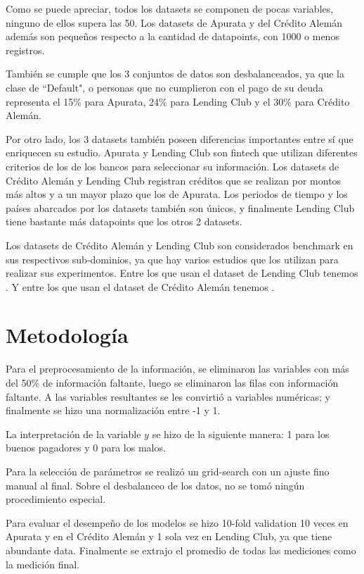 Como se puede apreciar, todos los datasets se componen de pocas variables, ninguno de ellos supera las 50. Los datasets de Apurata y del Crédito Alemán además son pequeños respecto a la cantidad de datapoints, con 1000 o menos registros.

También se cumple que los 3 conjuntos de datos son desbalanceados, ya que la clase de ``Default", o personas que no cumplieron con el pago de su deuda representa el 15\% para Apurata, 24\% para Lending Club y el 30\% para Crédito Alemán.

Por otro lado, los 3 datasets también poseen diferencias importantes entre sí que enriquecen su estudio. Apurata y Lending Club son fintech que utilizan diferentes criterios de los de los bancos para seleccionar su información. Los datasets de Crédito Alemán y Lending Club registran créditos que se realizan por montos más altos y a un mayor plazo que los de Apurata. Los periodos de tiempo y los países abarcados por los datasets también son únicos, y finalmente Lending Club tiene bastante más datapoints que los otros 2 datasets.

Los datasets de Crédito Alemán y Lending Club son considerados benchmark en sus respectivos sub-dominios, ya que hay varios estudios que los utilizan para realizar sus experimentos. Entre los que usan el dataset de Lending Club tenemos \cite{malekipirbazari2015risk, zhang2016research, zang2014credit, tan2018deep}. Y entre los que usan el dataset de Crédito Alemán tenemos \cite{harris2015credit, nanni2009experimental, brown2012experimental, wang2012two}.

\section{Metodología}

Para el preprocesamiento de la información, se eliminaron las variables con más del 50\% de información faltante, luego se eliminaron las filas con información faltante. A las variables resultantes se les convirtió a variables numéricas; y finalmente se hizo una normalización entre -1 y 1.

La interpretación de la variable $y$ se hizo de la siguiente manera: 1 para los buenos pagadores y 0 para los malos.

Para la selección de parámetros se realizó un grid-search con un ajuste fino manual al final. Sobre el desbalanceo de los datos, no se tomó ningún procedimiento especial. 

Para evaluar el desempeño de los modelos se hizo 10-fold validation 10 veces en Apurata y en el Crédito Alemán y 1 sola vez en Lending Club, ya que tiene abundante data. Finalmente se extrajo el promedio de todas las mediciones como la medición final. 

